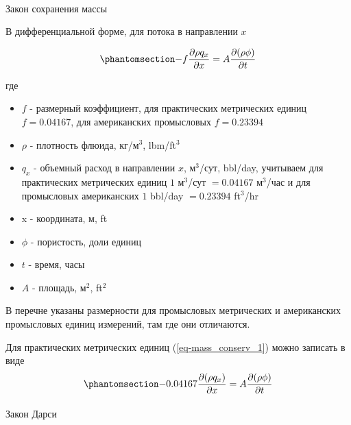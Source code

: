 \documentclass[
  russian,
  letterpaper,
  DIV=11,
  numbers=noendperiod,
  oneside]{scrartcl}
\makeatletter
\let\oldparagraph\paragraph
\renewcommand{\paragraph}{
    \@ifstar
      \xxxParagraphStar
      \xxxParagraphNoStar
  }
\newcommand{\xxxParagraphStar}[1]{\oldparagraph*{#1}\mbox{}}
\newcommand{\xxxParagraphNoStar}[1]{\oldparagraph{#1}\mbox{}}
\providecommand{\tightlist}{%
  \setlength{\itemsep}{0pt}\setlength{\parskip}{0pt}}
\makeatother
\begin{document}
\paragraph{Закон сохранения
массы}\label{ux437ux430ux43aux43eux43d-ux441ux43eux445ux440ux430ux43dux435ux43dux438ux44f-ux43cux430ux441ux441ux44b}

В дифференциальной форме, для потока в направлении \(x\)

\begin{equation}\phantomsection\label{eq-mass_conserv_1}{
-f \dfrac{\partial \rho q_x}{\partial x} = A \dfrac{\partial(\rho \phi)}{\partial t} 
}\end{equation}

где

\begin{itemize}
\tightlist
\item
  \(f\) - размерный коэффициент, для практических метрических единиц
  \(f= 0.04167\), для американских промысловых \(f = 0.23394\)
\item
  \(\rho\) - плотность флюида, кг/м\(^3\), lbm/ft\(^3\)
\item
  \(q_x\) - объемный расход в направлении \(x\), м\(^3\)/сут, bbl/day,
  учитываем для практических метрических единиц \(1\) м\(^3\)/сут
  \(= 0.04167\) м\(^3\)/час и для промысловых американских \(1\) bbl/day
  \(= 0.23394\) ft\(^3\)/hr\\
\item
  x - координата, м, ft
\item
  \(\phi\) - пористость, доли единиц
\item
  \(t\) - время, часы
\item
  \(A\) - площадь, м\(^2\), ft\(^2\)
\end{itemize}

В перечне указаны размерности для промысловых метрических и американских
промысловых единиц измерений, там где они отличаются.

Для практических метрических единиц (\ref{eq-mass_conserv_1}) можно
записать в виде
\begin{equation}\phantomsection\label{eq-mass_conserv_2}{
-0.04167 \dfrac{ \partial (\rho q_x) }{\partial x} = A \dfrac{\partial(\rho \phi)}{\partial t} 
}\end{equation}

\paragraph{Закон
Дарси}\label{ux437ux430ux43aux43eux43d-ux434ux430ux440ux441ux438}
\end{document}
